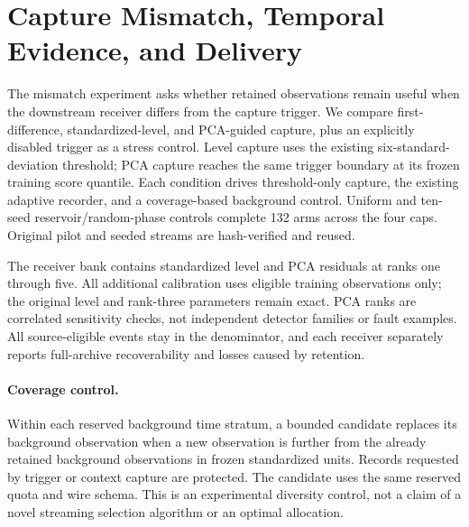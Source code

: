 \section{Capture Mismatch, Temporal Evidence, and Delivery}
\label{sec:mismatch}
The mismatch experiment asks whether retained observations remain useful
when the downstream receiver differs from the capture trigger. We compare
first-difference, standardized-level, and PCA-guided capture, plus an explicitly
disabled trigger as a stress control. Level capture uses the existing six-standard-
deviation threshold; PCA capture reaches the same trigger boundary at its frozen
training score quantile. Each condition drives threshold-only capture, the existing
adaptive recorder, and a coverage-based background control. Uniform and ten-seed
reservoir/random-phase controls complete 132 arms across the four caps.
Original pilot and seeded streams are hash-verified and reused.

The receiver bank contains standardized level and PCA residuals at ranks one
through five. All additional calibration uses eligible training observations only;
the original level and rank-three parameters remain exact. PCA ranks are correlated
sensitivity checks, not independent detector families or fault examples. All
source-eligible events stay in the denominator, and each receiver separately reports
full-archive recoverability and losses caused by retention.

\paragraph{Coverage control.}
Within each reserved background time stratum, a bounded candidate replaces its
background observation when a new observation is further from the already retained
background observations in frozen standardized units. Records requested by trigger
or context capture are protected. The candidate uses the same reserved quota and
wire schema. This is an experimental diversity control, not a claim of a novel
streaming selection algorithm or an optimal allocation.

\begin{table}[htbp]
\centering
\scriptsize

\caption{Capture mismatch at the 1,024-byte hourly cap. ``Blind'' means no
capture threshold crossing within the event; nearby triggers can still preserve
context. The conditional denominator includes only full-archive PCA-recoverable
events. All 11 source-eligible events remain in the overall event denominator.}
\label{tab:mismatch}
\end{table}

